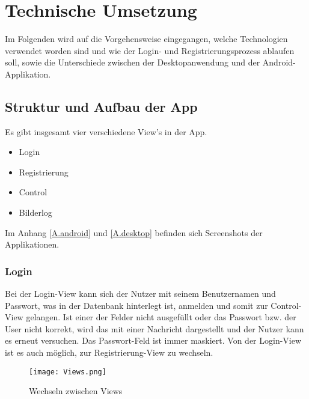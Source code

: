 				
				
\chapter{Technische Umsetzung}
Im Folgenden wird auf die Vorgehensweise eingegangen, welche Technologien verwendet worden sind und wie der Login- und Registrierungsprozess ablaufen soll, sowie die Unterschiede zwischen der Desktopanwendung und der Android-Applikation.



\section{Struktur und Aufbau der App}
Es gibt insgesamt vier verschiedene View's in der App.
\begin{itemize}
	\item Login
	\item Registrierung
	\item Control
	\item Bilderlog
\end{itemize}

Im Anhang \ref{A.android} und \ref{A.desktop} befinden sich Screenshots der Applikationen.\\

\subsection{Login}
Bei der Login-View kann sich der Nutzer mit seinem Benutzernamen und Passwort, was in der Datenbank hinterlegt ist, anmelden und somit zur Control-View gelangen. Ist einer der Felder nicht ausgefüllt oder das Passwort bzw. der User nicht korrekt, wird das mit einer Nachricht dargestellt und der Nutzer kann es erneut versuchen. Das Passwort-Feld ist immer maskiert. Von der Login-View ist es auch möglich, zur Registrierung-View zu wechseln.\\


\begin{figure}[h]
  \begin{center}
    \texttt{[image: Views.png]}
  		  \caption{Wechseln zwischen Views}
     \label{fig.Views}
  \end{center}
\end{figure}


